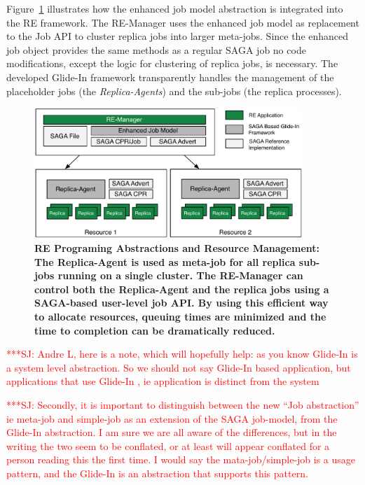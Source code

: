 \documentclass{rspublic}
\newcommand{\jhanote}[1]{ {\textcolor{red} { ***SJ: #1 }}}
\newcommand{\jhanote}[1]{}
\newcommand{\glidein}[1]{Glide-In }
\newcommand{\replicaagent}[1]{Replica-Agent }
\newcommand{\remanager}[1]{RE-Manager }
\begin{document}
Figure~\ref{fig:remdmanager_v1.1} illustrates how the enhanced job model abstraction is integrated
into the RE framework. The \remanager\  uses the enhanced job model as replacement to the Job API
to  cluster replica jobs into larger meta-jobs. Since the enhanced job object provides the same methods
as a regular SAGA job  no code modifications, except the logic for clustering of replica jobs, 
is necessary. The developed \glidein\ framework transparently handles the management of the placeholder jobs
(the \textit{Replica-Agents}) and the sub-jobs (the replica processes). 


\begin{figure}[t]
    \centering
    \includegraphics[width=0.9\textwidth]{remdmanager_v11}
    \caption{\footnotesize \bf RE Programing Abstractions and
      Resource Management: The Replica-Agent is used as meta-job for
      all replica sub-jobs running on a single cluster. The
      \remanager\ can control both the \replicaagent\ and the replica
      jobs using a SAGA-based user-level job API. By using this
      efficient way to allocate resources, queuing times are minimized
      and the time to completion can be dramatically reduced.}
    \label{fig:remdmanager_v1.1}
\end{figure}

\jhanote{Andre L, here is a note, which will hopefully help: as you
  know \glidein\ is a system level abstraction. So we should not say
  \glidein\ based application, but applications that use \glidein\ ,
  ie application is distinct from the system}

\jhanote{Secondly, it is important to distinguish between the new
  ``Job abstraction'' ie meta-job and simple-job as an extension of
  the SAGA job-model, from the \glidein\ abstraction. I am sure we are
  all aware of the differences, but in the writing the two seem to be
  conflated, or at least will appear conflated for a person reading
  this the first time. I would say the mata-job/simple-job is a usage
  pattern, and the \glidein\ is an abstraction that supports this
  pattern.}
\end{document}
